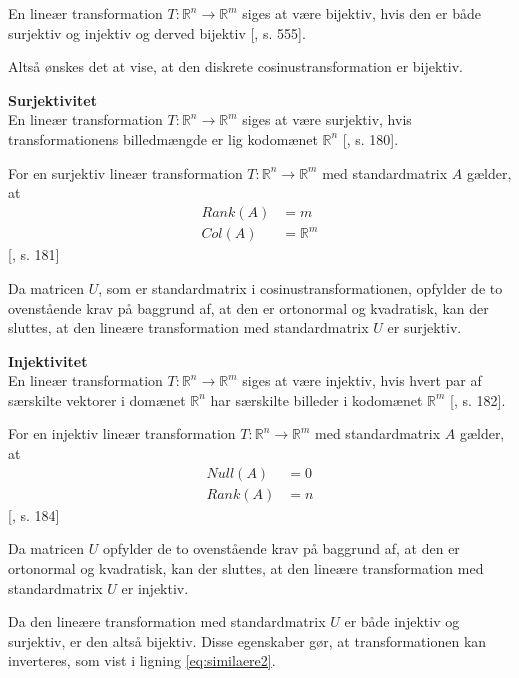 En lineær transformation $T:\mathbb{R}^n \longrightarrow \mathbb{R}^m$ siges at være bijektiv, hvis den er både surjektiv og injektiv og derved bijektiv [\citet{linalg}, s. 555].

Altså ønskes det at vise, at den diskrete cosinustransformation er bijektiv.

\textbf{Surjektivitet}\\
En lineær transformation $T:\mathbb{R}^n \longrightarrow \mathbb{R}^m$ siges at være surjektiv, hvis transformationens billedmængde er lig kodomænet $\mathbb{R}^n$ [\citet{linalg}, s. 180].

For en surjektiv lineær transformation $T:\mathbb{R}^n \longrightarrow \mathbb{R}^m$ med standardmatrix $A$ gælder, at
\begin{align}
Rank(A)	&	=m\\
Col(A)	&	=\mathbb{R}^m
\end{align} [\citet{linalg}, s. 181]

Da matricen $U$, som er standardmatrix i cosinustransformationen, opfylder de to ovenstående krav på baggrund af, at den er ortonormal og kvadratisk, kan der sluttes, at den lineære transformation med standardmatrix $U$ er surjektiv.

\textbf{Injektivitet}\\
En lineær transformation $T:\mathbb{R}^n \longrightarrow \mathbb{R}^m$ siges at være injektiv, hvis hvert par af særskilte vektorer i domænet $\mathbb{R}^n$ har særskilte billeder i kodomænet $\mathbb{R}^m$ [\citet{linalg}, s. 182].

For en injektiv lineær transformation $T:\mathbb{R}^n \longrightarrow \mathbb{R}^m$ med standardmatrix $A$ gælder, at
\begin{align}
Null(A)	&	=0\\
Rank(A)	&	=n
\end{align} [\citet{linalg}, s. 184]

Da matricen $U$ opfylder de to ovenstående krav på baggrund af, at den er ortonormal og kvadratisk, kan der sluttes, at den lineære transformation med standardmatrix $U$ er injektiv.

Da den lineære transformation med standardmatrix $U$ er både injektiv og surjektiv, er den altså bijektiv. Disse egenskaber gør, at transformationen kan inverteres, som vist i ligning \ref{eq:similaere2}.
